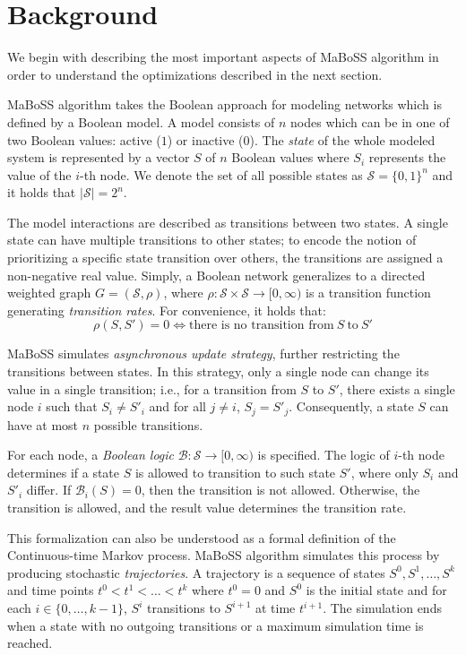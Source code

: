 \documentclass[times, twoside]{zHenriquesLab-StyleBioRxiv}
\begin{document}
\section*{Background}

We begin with describing the most important aspects of MaBoSS algorithm in order to understand the optimizations described in the next section.  

MaBoSS algorithm takes the Boolean approach for modeling networks which is defined by a Boolean model. A model consists of $n$ nodes which can be in one of two Boolean values: active ($1$) or inactive ($0$). The \emph{state} of the whole modeled system is represented by a vector $S$ of $n$ Boolean values where $S_i$ represents the value of the $i$-th node. We denote the set of all possible states as $\mathcal{S} = \{0, 1\}^n$ and it holds that $|\mathcal{S}| = 2^n$. 

The model interactions are described as transitions between two states. A single state can have multiple transitions to other states; to encode the notion of prioritizing a specific state transition over others, the transitions are assigned a non-negative real value. Simply, a Boolean network generalizes to a directed weighted graph $G = (\mathcal{S}, \rho)$, where $\rho: \mathcal{S} \times \mathcal{S} \rightarrow [0, \infty)$ is a transition function generating \emph{transition rates}. For convenience, it holds that:
\begin{equation}
    \rho(S, S') = 0 \iff \text{there is no transition from}\ S\ \text{to}\ S'
\end{equation}

MaBoSS simulates \emph{asynchronous update strategy}, further restricting the transitions between states. In this strategy, only a single node can change its value in a single transition; i.e., for a transition from $S$ to $S'$, there exists a single node $i$ such that $S_i \neq S'_i$ and for all $j \neq i$, $S_j = S'_j$. Consequently, a state $S$ can have at most $n$ possible transitions.

For each node, a \emph{Boolean logic} $\mathcal{B}: \mathcal{S} \rightarrow [0, \infty)$ is specified. The logic of $i$-th node determines if a state $S$ is allowed to transition to such state $S'$, where only $S_i$ and $S'_i$ differ. If $\mathcal{B}_i(S) = 0$, then the transition is not allowed. Otherwise, the transition is allowed, and the result value determines the transition rate.

This formalization can also be understood as a formal definition of the Continuous-time Markov process. MaBoSS algorithm simulates this process by producing stochastic \emph{trajectories}. A trajectory is a sequence of states $S^0, S^1, \dots, S^k$ and time points $t^0 < t^1 < \dots < t^k$ where $t^0 = 0$ and $S^0$ is the initial state and for each $i \in \{0, \dots, k-1\}$, $S^i$ transitions to $S^{i+1}$ at time $t^{i+1}$. The simulation ends when a state with no outgoing transitions or a maximum simulation time is reached.
\end{document}
